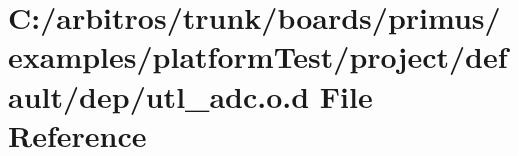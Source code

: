 \hypertarget{platform_test_2project_2default_2dep_2utl__adc_8o_8d}{\section{C\-:/arbitros/trunk/boards/primus/examples/platform\-Test/project/default/dep/utl\-\_\-adc.o.\-d File Reference}
\label{platform_test_2project_2default_2dep_2utl__adc_8o_8d}
}
